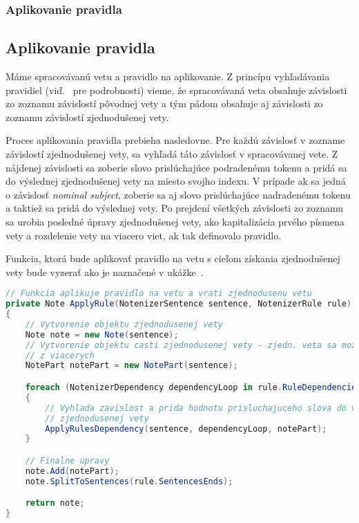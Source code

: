 %
%
{
	\subsubsection{Aplikovanie pravidla}
}
{
	\subsection{Aplikovanie pravidla}
}
\label{subsubsection:rule_application}
Máme spracovávanú vetu a pravidlo na aplikovanie. Z princípu vyhľadávania pravidiel (viď.~ pre podrobnosti) vieme, že spracovávaná veta obsahuje závislosti zo zoznamu závislostí pôvodnej vety a tým pádom obsahuje aj závislosti zo zoznamu závislostí zjednodušenej vety. 

Proces aplikovania pravidla prebieha nasledovne. Pre každú závislosť v zozname závislostí zjednodušenej vety, sa vyhľadá táto závislosť v spracovávanej vete. Z nájdenej závislosti sa zoberie slovo prislúchajúce podradenému tokenu a pridá sa do výslednej zjednodušenej vety na miesto svojho indexu. V prípade ak sa jedná o závislosť \textit{nominal subject}, zoberie sa aj slovo prislúchajúce nadradenému tokenu a taktiež sa pridá do výslednej vety. Po prejdení všetkých závislosti zo zoznamu sa urobia posledné úpravy zjednodušenej vety, ako kapitalizácia prvého písmena vety a rozdelenie vety na viacero viet, ak tak definovalo pravidlo.

Funkcia, ktorá bude aplikovať pravidlo na vetu s cieľom získania zjednodušenej vety bude vyzerať ako je naznačené v ukážke~.
\\

\begin{lstlisting}[language = csharp, caption={Aplikovanie pravidla}, label = {code:apply_rule_example}]
// Funkcia aplikuje pravidlo na vetu a vrati zjednodusenu vetu
private Note ApplyRule(NotenizerSentence sentence, NotenizerRule rule)
{
	// Vytvorenie objektu zjednodusenej vety
	Note note = new Note(sentence);
	// Vytvorenie objektu casti zjednodusenej vety - zjedn. veta sa moze skladat
	// z viacerych
	NotePart notePart = new NotePart(sentence);

	foreach (NotenizerDependency dependencyLoop in rule.RuleDependencies)
	{
		// Vyhlada zavislost a prida hodnotu prisluchajuceho slova do vyslednej
		// zjednodusenej vety
		ApplyRulesDependency(sentence, dependencyLoop, notePart);
	}

	// Finalne upravy
	note.Add(notePart);
	note.SplitToSentences(rule.SentencesEnds);

	return note;
}
\end{lstlisting}


